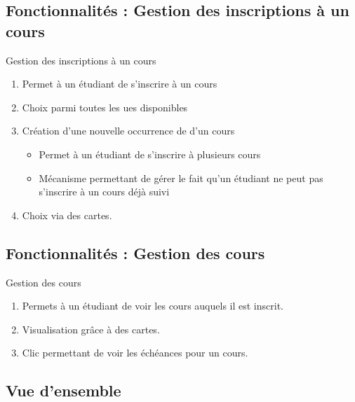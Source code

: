 \documentclass[numbering=fraction,10pt]{beamer}
\begin{document}
\subsection{Fonctionnalités : Gestion des inscriptions à un cours}
\begin{frame}{Gestion des inscriptions à un cours}
    \begin{enumerate}
        \item Permet à un étudiant de s'inscrire à un cours
        \item Choix parmi toutes les ues disponibles
        \item Création d'une nouvelle occurrence de d'un cours
        \begin{itemize}
            \item Permet à un étudiant de s'inscrire à plusieurs cours
            \item Mécanisme permettant de gérer le fait qu'un étudiant ne peut pas s'inscrire à un cours déjà suivi
        \end{itemize}
        \item Choix via des cartes.
    \end{enumerate}
\end{frame}
\subsection{Fonctionnalités : Gestion des cours}
\begin{frame}{Gestion des cours}
    \begin{enumerate}
        \item Permets à un étudiant de voir les cours auquels il est inscrit.
        \item Visualisation grâce à des cartes.
        \item Clic permettant de voir les échéances pour un cours.
    \end{enumerate}
\end{frame}

\subsection{Vue d'ensemble}
\end{document}
